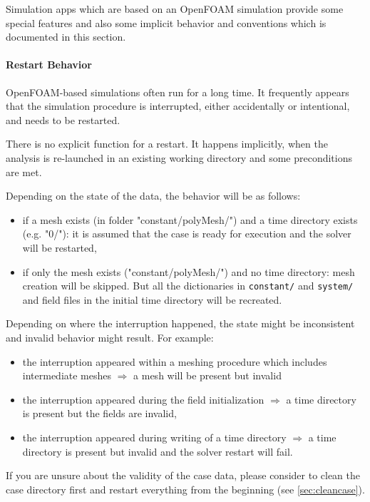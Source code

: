 Simulation apps which are based on an OpenFOAM simulation provide some special features and also some implicit behavior and conventions which is documented in this section.

\paragraph{Restart Behavior}
OpenFOAM-based simulations often run for a long time. 
It frequently appears that the simulation procedure is interrupted, either accidentally or intentional, and needs to be restarted.

There is no explicit function for a restart.
It happens implicitly, when the analysis is re-launched in an existing working directory and some preconditions are met.

Depending on the state of the data, the behavior will be as follows:
\begin{itemize}

\item if a mesh exists (in folder "constant/polyMesh/") and a time directory exists (e.g. "0/"): it is assumed that the case is ready for execution and the solver will be restarted,

\item if only the mesh exists ("constant/polyMesh/") and no time directory: mesh creation will be skipped. But all the dictionaries in \texttt{constant/} and \texttt{system/} and field files in the initial time directory will be recreated.

\end{itemize}

Depending on where the interruption happened, the state might be inconsistent and invalid behavior might result.
For example:
\begin{itemize}
\item the interruption appeared within a meshing procedure which includes intermediate meshes $\Rightarrow$ a mesh will be present but invalid
\item the interruption appeared during the field initialization $\Rightarrow$ a time directory is present but the fields are invalid,
\item the interruption appeared during writing of a time directory $\Rightarrow$ a time directory is present but invalid and the solver restart will fail.
\end{itemize}

If you are unsure about the validity of the case data, please consider to clean the case directory first and restart everything from the beginning (see \ref{sec:cleancase}).

